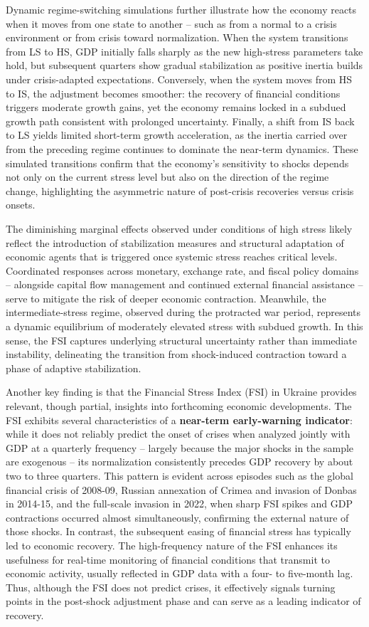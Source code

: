 \documentclass[12pt,preprint,aps,author-year]{revtex4-1}
\begin{document}
Dynamic regime-switching simulations further illustrate how the economy reacts when it moves from one state to another – such as from a normal to a crisis environment or from crisis toward normalization. When the system transitions from LS to HS, GDP initially falls sharply as the new high-stress parameters take hold, but subsequent quarters show gradual stabilization as positive inertia builds under crisis-adapted expectations. Conversely, when the system moves from HS to IS, the adjustment becomes smoother: the recovery of financial conditions triggers moderate growth gains, yet the economy remains locked in a subdued growth path consistent with prolonged uncertainty. Finally, a shift from IS back to LS yields limited short-term growth acceleration, as the inertia carried over from the preceding regime continues to dominate the near-term dynamics. These simulated transitions confirm that the economy’s sensitivity to shocks depends not only on the current stress level but also on the direction of the regime change, highlighting the asymmetric nature of post-crisis recoveries versus crisis onsets.

The diminishing marginal effects observed under conditions of high stress likely reflect the introduction of stabilization measures and structural adaptation of economic agents that is triggered once systemic stress reaches critical levels. Coordinated responses across monetary, exchange rate, and fiscal policy domains – alongside capital flow management and continued external financial assistance – serve to mitigate the risk of deeper economic contraction. Meanwhile, the intermediate-stress regime, observed during the protracted war period, represents a dynamic equilibrium of moderately elevated stress with subdued growth. In this sense, the FSI captures underlying structural uncertainty rather than immediate instability, delineating the transition from shock-induced contraction toward a phase of adaptive stabilization.

Another key finding is that the Financial Stress Index (FSI) in Ukraine provides relevant, though partial, insights into forthcoming economic developments. The FSI exhibits several characteristics of a \textbf{near-term early-warning indicator}: while it does not reliably predict the onset of crises when analyzed jointly with GDP at a quarterly frequency – largely because the major shocks in the sample are exogenous – its normalization consistently precedes GDP recovery by about two to three quarters. This pattern is evident across episodes such as the global financial crisis of 2008-09, Russian annexation of Crimea and invasion of Donbas in 2014-15, and the full-scale invasion in 2022, when sharp FSI spikes and GDP contractions occurred almost simultaneously, confirming the external nature of those shocks. In contrast, the subsequent easing of financial stress has typically led to economic recovery. The high-frequency nature of the FSI enhances its usefulness for real-time monitoring of financial conditions that transmit to economic activity, usually reflected in GDP data with a four- to five-month lag. Thus, although the FSI does not predict crises, it effectively signals turning points in the post-shock adjustment phase and can serve as a leading indicator of recovery.
\end{document}
